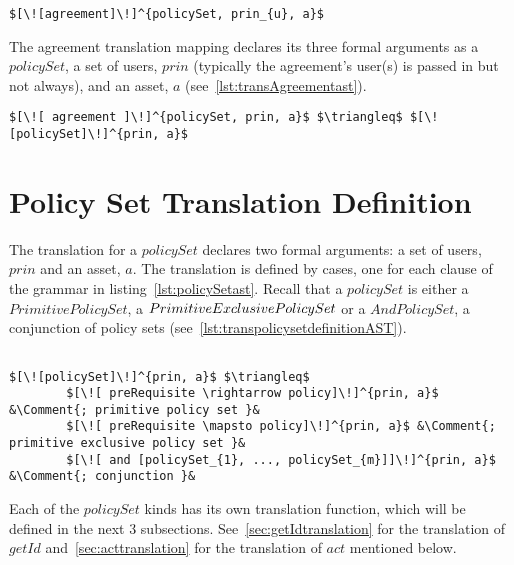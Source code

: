 \lstset{mathescape, language=AST}  
\begin{lstlisting}[frame=single, caption={Agreement Translation Invocation},label={lst:transAgreementInvocationast}]
$[\![agreement]\!]^{policySet, prin_{u}, a}$
\end{lstlisting}

The agreement translation mapping declares its three formal arguments as a $policySet$, a set of users, $prin$ (typically the agreement's user(s) is passed in but not always), and an asset, $a$ (see~\ref{lst:transAgreementast}).


\lstset{mathescape, language=AST}  
\begin{lstlisting}[frame=single, caption={Agreement Translation Definition},label={lst:transAgreementast}]
$[\![ agreement ]\!]^{policySet, prin, a}$ $\triangleq$ $[\![policySet]\!]^{prin, a}$
\end{lstlisting}

\section{Policy Set Translation Definition}
The translation for a $policySet$ declares two formal arguments: a set of users, $prin$ and an asset, $a$.
The translation is defined by cases, one for each clause of the grammar in listing~\ref{lst:policySetast}. Recall that a $policySet$ is either a $PrimitivePolicySet$, a $\linebreak PrimitiveExclusivePolicySet$ or a $AndPolicySet$, a conjunction of policy sets (see~\ref{lst:transpolicysetdefinitionAST}).

\lstset{mathescape, language=AST}  
\begin{lstlisting}[frame=single, caption={Policy Set Translation Definition},label={lst:transpolicysetdefinitionAST}]

$[\![policySet]\!]^{prin, a}$ $\triangleq$ 
        $[\![ preRequisite \rightarrow policy]\!]^{prin, a}$ &\Comment{; primitive policy set }&
        $[\![ preRequisite \mapsto policy]\!]^{prin, a}$ &\Comment{; primitive exclusive policy set }&
        $[\![ and [policySet_{1}, ..., policySet_{m}]]\!]^{prin, a}$ &\Comment{; conjunction }&

\end{lstlisting}


Each of the $policySet$ kinds has its own translation function, which will be defined in the next 3 subsections. See~\ref{sec:getIdtranslation} for the translation of $getId$ and~\ref{sec:acttranslation} for the translation of $act$ mentioned below.



